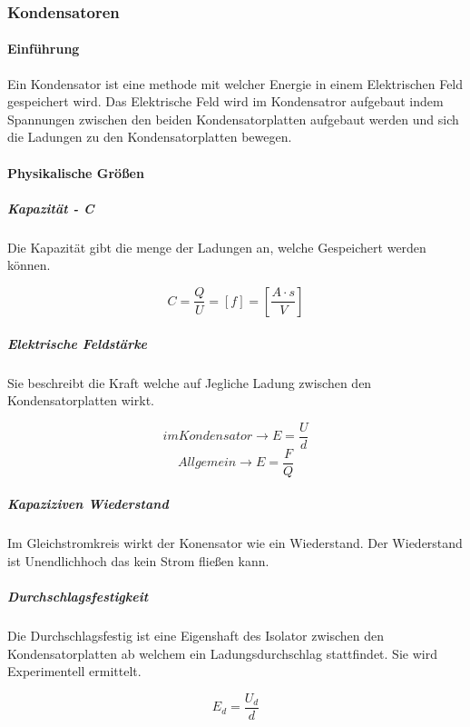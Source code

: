 \documentclass{article}
\begin{document}
        	\subsubsection{Kondensatoren}
        	
        		\paragraph{Einführung \newline}
        		
        			Ein Kondensator ist eine methode mit welcher Energie in einem Elektrischen Feld gespeichert wird. Das Elektrische Feld wird im Kondensatror aufgebaut indem Spannungen zwischen den beiden Kondensatorplatten aufgebaut werden und sich die Ladungen zu den Kondensatorplatten bewegen. 
        			
       			\paragraph{Physikalische Größen}
       			
       				\subparagraph{Kapazität - C}
       				
       					Die Kapazität gibt die menge der Ladungen an, welche Gespeichert werden können. 
       					
       					\[C = \frac{Q}{U} = [f] = [\frac{A\cdot s}{V}]\]
     					
     				\subparagraph{Elektrische Feldstärke}
     				
     					Sie beschreibt die Kraft welche auf Jegliche Ladung zwischen den Kondensatorplatten wirkt. 
     					
     					\[im Kondensator \longrightarrow E = \frac{U}{d}\] 
     					\[Allgemein \longrightarrow E = \frac{F}{Q}\]
     					
    				\subparagraph{Kapaziziven Wiederstand}
    				
    					Im Gleichstromkreis wirkt der Konensator wie ein Wiederstand. Der Wiederstand ist Unendlichhoch das kein Strom fließen kann. 
    					
    				\subparagraph{Durchschlagsfestigkeit}
    				
    					Die Durchschlagsfestig ist eine Eigenshaft des Isolator zwischen den Kondensatorplatten ab welchem ein Ladungsdurchschlag stattfindet. Sie wird Experimentell ermittelt. 
    					
    					\[E_{d} = \frac{U_{d}}{d}\]
    					
\end{document}
